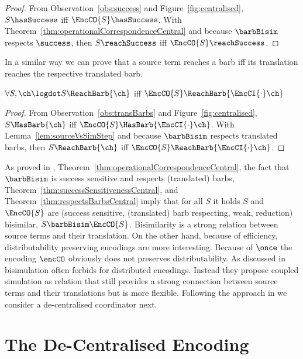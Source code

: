 \documentclass[]{eptcs}
\begin{document}
\begin{proof}
	From Observation~\ref{obs:success} and Figure~\ref{fig:centralised}, $ S\hasSuccess $ iff $ \EncCO{S}\hasSuccess $. With Theorem~\ref{thm:operationalCorrespondenceCentral} and because $ \barbBisim $ respects $ \success $, then $ S\reachSuccess $ iff $ \EncCO{S}\reachSuccess $.
\end{proof}

In a similar way we can prove that a source term reaches a barb iff its translation reaches the respective translated barb.

\begin{theorem}
	$ \forall S, \ch\logdot S\ReachBarb{\ch} $ iff $ \EncCO{S}\ReachBarb{\EncCI{\cdot}\ch} $
	\label{thm:respectsBarbsCentral}
\end{theorem}

\begin{proof}
	From Observation~\ref{obs:transBarbs} and Figure~\ref{fig:centralised}, $ S\HasBarb{\ch} $ iff $ \EncCO{S}\HasBarb{\EncCI{\cdot}\ch} $. With Lemma~\ref{lem:sourceVsSimStep} and because $ \barbBisim $ respects translated barbs, then $ S\ReachBarb{\ch} $ iff $ \EncCO{S}\ReachBarb{\EncCI{\cdot}\ch} $.
\end{proof}

As proved in \cite{petersGlabbeek15}, Theorem~\ref{thm:operationalCorrespondenceCentral}, the fact that $ \barbBisim $ is success sensitive and respects (translated) barbs, Theorem~\ref{thm:successSensitivenessCentral}, and Theorem~\ref{thm:respectsBarbsCentral} imply that for all $ S $ it holds $ S $ and $ \EncCO{S} $ are (success sensitive, (translated) barb respecting, weak, reduction) bisimilar, \ie $ S \barbBisim \EncCO{S} $.
Bisimilarity is a strong relation between source terms and their translation. On the other hand, because of efficiency, distributability preserving encodings are more interesting.
Because of $ \once $ the encoding $ \encCO $ obviously does not preserves distributability. As discussed in \cite{parrowCoupled92} bisimulation often forbids for distributed encodings. Instead they propose coupled simulation as relation that still provides a strong connection between source terms and their translations but is more flexible. Following the approach in \cite{parrowCoupled92} we consider a de-centralised coordinator next.

\section{The De-Centralised Encoding}
\label{sec:decentral}
\end{document}
